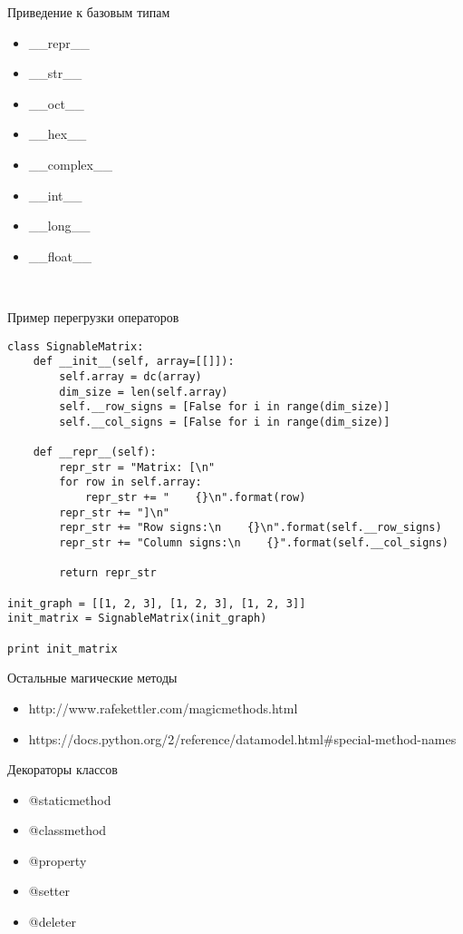 \documentclass[hyperref={pdftex,unicode}]{beamer}
\begin{document}
\begin{frame}{Приведение к базовым типам}
  \begin{itemize}
  \item \_\_repr\_\_
  \item \_\_str\_\_
  \item \_\_oct\_\_
  \item \_\_hex\_\_
  \item \_\_complex\_\_
  \item \_\_int\_\_
  \item \_\_long\_\_
  \item \_\_float\_\_
  \end{itemize}\
\end{frame}

\begin{frame}[fragile]{Пример перегрузки операторов}
    \begin{lstlisting}[basicstyle=\tiny\ttfamily]
class SignableMatrix:
    def __init__(self, array=[[]]):
        self.array = dc(array)
        dim_size = len(self.array)
        self.__row_signs = [False for i in range(dim_size)]
        self.__col_signs = [False for i in range(dim_size)]

    def __repr__(self):
        repr_str = "Matrix: [\n"
        for row in self.array:
            repr_str += "    {}\n".format(row)
        repr_str += "]\n"
        repr_str += "Row signs:\n    {}\n".format(self.__row_signs)
        repr_str += "Column signs:\n    {}".format(self.__col_signs)
        
        return repr_str

init_graph = [[1, 2, 3], [1, 2, 3], [1, 2, 3]]
init_matrix = SignableMatrix(init_graph)

print init_matrix
    \end{lstlisting}
\end{frame}

\begin{frame}{Остальные магические методы}
\begin{itemize}
  \item http://www.rafekettler.com/magicmethods.html
  \item \scriptsize{https://docs.python.org/2/reference/datamodel.html\#special-method-names}
\end{itemize}
\end{frame}

\begin{frame}{Декораторы классов}
  \begin{itemize}
  \item @staticmethod
  \item @classmethod
  \item @property
  \item @setter
  \item @deleter
  \end{itemize}
\end{frame}
\end{document}

